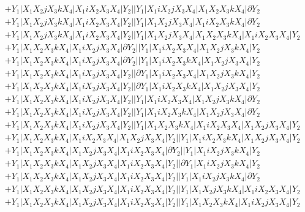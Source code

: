 \documentclass{article}[12pt]
\begin{document}
\begin{align*}
 & +Y_1|X_1X_2jX_3kX_4|X_1iX_2X_3X_4|Y_2||Y_1|X_1iX_2jX_3X_4|X_1X_2X_3kX_4|\partial Y_2\\ 
 & +Y_1|X_1X_2jX_3kX_4|X_1iX_2X_3X_4|Y_2||Y_1|X_1X_2jX_3X_4|X_1iX_2X_3kX_4|\partial Y_2\\ 
 & +Y_1|X_1X_2jX_3kX_4|X_1iX_2X_3X_4|Y_2||Y_1|X_1X_2jX_3X_4|X_1X_2X_3kX_4|X_1iX_2X_3X_4|Y_2\\ 
 & +Y_1|X_1X_2X_3kX_4|X_1iX_2jX_3X_4|\partial Y_2||Y_1|X_1iX_2X_3X_4|X_1X_2jX_3kX_4|Y_2\\ 
 & +Y_1|X_1X_2X_3kX_4|X_1iX_2jX_3X_4|\partial Y_2||Y_1|X_1iX_2X_3kX_4|X_1X_2jX_3X_4|Y_2\\ 
 & +Y_1|X_1X_2X_3kX_4|X_1iX_2jX_3X_4|Y_2||\partial Y_1|X_1iX_2X_3X_4|X_1X_2jX_3kX_4|Y_2\\ 
 & +Y_1|X_1X_2X_3kX_4|X_1iX_2jX_3X_4|Y_2||\partial Y_1|X_1iX_2X_3kX_4|X_1X_2jX_3X_4|Y_2\\ 
 & +Y_1|X_1X_2X_3kX_4|X_1iX_2jX_3X_4|Y_2||Y_1|X_1iX_2X_3X_4|X_1X_2jX_3kX_4|\partial Y_2\\ 
 & +Y_1|X_1X_2X_3kX_4|X_1iX_2jX_3X_4|Y_2||Y_1|X_1iX_2X_3kX_4|X_1X_2jX_3X_4|\partial Y_2\\ 
 & +Y_1|X_1X_2X_3kX_4|X_1iX_2jX_3X_4|Y_2||Y_1|X_1X_2X_3kX_4|X_1iX_2X_3X_4|X_1X_2jX_3X_4|Y_2\\ 
 & +Y_1|X_1X_2X_3kX_4|X_1iX_2X_3X_4|X_1X_2jX_3X_4|Y_2||Y_1|X_1iX_2X_3kX_4|X_1X_2jX_3X_4|Y_2\\ 
 & +Y_1|X_1X_2X_3kX_4|X_1X_2jX_3X_4|X_1iX_2X_3X_4|\partial Y_2||Y_1|X_1iX_2jX_3kX_4|Y_2\\ 
 & +Y_1|X_1X_2X_3kX_4|X_1X_2jX_3X_4|X_1iX_2X_3X_4|Y_2||\partial Y_1|X_1iX_2jX_3kX_4|Y_2\\ 
 & +Y_1|X_1X_2X_3kX_4|X_1X_2jX_3X_4|X_1iX_2X_3X_4|Y_2||Y_1|X_1iX_2jX_3kX_4|\partial Y_2\\ 
 & +Y_1|X_1X_2X_3kX_4|X_1X_2jX_3X_4|X_1iX_2X_3X_4|Y_2||Y_1|X_1X_2jX_3kX_4|X_1iX_2X_3X_4|Y_2\\ 
 & +Y_1|X_1X_2X_3kX_4|X_1X_2jX_3X_4|X_1iX_2X_3X_4|Y_2||Y_1|X_1X_2X_3kX_4|X_1iX_2jX_3X_4|Y_2\end{align*}
 
 
\end{document}
